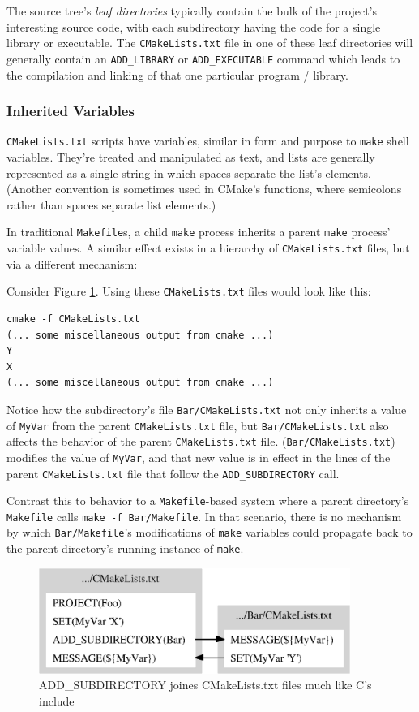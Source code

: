 \documentclass[letterpaper,10pt]{article}
\begin{document}
The source tree's \textit{leaf directories} typically contain the bulk of the project's 
interesting source code, with each subdirectory having the code for a single
library or executable.  The \verb|CMakeLists.txt| file in one of these leaf
directories will generally contain an \verb|ADD_LIBRARY| or \verb|ADD_EXECUTABLE|
command which leads to the compilation and linking of that one particular
program / library.

\subsubsection{Inherited Variables}
\verb|CMakeLists.txt| scripts have variables, similar in form and purpose
to \verb|make| shell variables.  They're treated and manipulated as text, and
lists are generally represented as a single string in which spaces separate
the list's elements.  (Another convention is sometimes used in CMake's functions,
where semicolons rather than spaces separate list elements.)

In traditional \verb|Makefile|s, a child \verb|make| process inherits a 
parent \verb|make| process' variable values.  A similar effect exists in
a hierarchy of \verb|CMakeLists.txt| files, but via a different mechanism:

Consider Figure \ref{fig:cmake-file-structure}.  Using these 
\verb|CMakeLists.txt| files would look like this:
\begin{verbatim}
cmake -f CMakeLists.txt
(... some miscellaneous output from cmake ...)
Y
X
(... some miscellaneous output from cmake ...)
\end{verbatim} 

Notice how the subdirectory's file \verb|Bar/CMakeLists.txt| not 
only inherits a value of \verb|MyVar| from the parent \verb|CMakeLists.txt| 
file, but \verb|Bar/CMakeLists.txt| also affects the behavior of the
parent \verb|CMakeLists.txt| file.  (\verb|Bar/CMakeLists.txt|) modifies
the value of \verb|MyVar|, and that new value is in effect in the 
lines of the parent \verb|CMakeLists.txt| file that follow the 
\verb|ADD_SUBDIRECTORY| call.  

Contrast this to behavior to a \verb|Makefile|-based system where 
a parent directory's \verb|Makefile| calls \verb|make -f Bar/Makefile|.
In that scenario, there is no mechanism by which \verb|Bar/Makefile|'s
modifications of \verb|make| variables could propagate back to the 
parent directory's running instance of \verb|make|.

\begin{figure}
 \centering
\includegraphics[width=4in]{file-structure.eps}
   \caption{ADD\_SUBDIRECTORY joines CMakeLists.txt files much like C's include}
   \label{fig:cmake-file-structure}
\end{figure}
\end{document}
